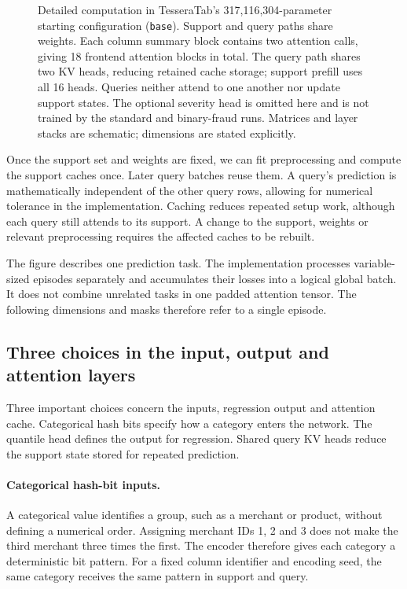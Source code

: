 \documentclass[11pt]{article}
\begin{document}
\begin{figure}[htbp]
\begin{tikzpicture}
\end{tikzpicture}
\caption{Detailed computation in TesseraTab's 317,116,304-parameter starting configuration (\texttt{base}). Support and query paths share weights. Each column summary block contains two attention calls, giving 18 frontend attention blocks in total. The query path shares two KV heads, reducing retained cache storage; support prefill uses all 16 heads. Queries neither attend to one another nor update support states. The optional severity head is omitted here and is not trained by the standard and binary-fraud runs. Matrices and layer stacks are schematic; dimensions are stated explicitly.}
\label{fig:model-overview}
\end{figure}

Once the support set and weights are fixed, we can fit preprocessing and compute the support caches once. Later query batches reuse them. A query's prediction is mathematically independent of the other query rows, allowing for numerical tolerance in the implementation. Caching reduces repeated setup work, although each query still attends to its support. A change to the support, weights or relevant preprocessing requires the affected caches to be rebuilt.

The figure describes one prediction task. The implementation processes variable-sized episodes separately and accumulates their losses into a logical global batch. It does not combine unrelated tasks in one padded attention tensor. The following dimensions and masks therefore refer to a single episode.

\subsection{Three choices in the input, output and attention layers}
\label{sec:architecture-terms}

Three important choices concern the inputs, regression output and attention cache. Categorical hash bits specify how a category enters the network. The quantile head defines the output for regression. Shared query KV heads reduce the support state stored for repeated prediction.

\paragraph{Categorical hash-bit inputs.}
A categorical value identifies a group, such as a merchant or product, without defining a numerical order. Assigning merchant IDs 1, 2 and 3 does not make the third merchant three times the first. The encoder therefore gives each category a deterministic bit pattern. For a fixed column identifier and encoding seed, the same category receives the same pattern in support and query.
\end{document}
